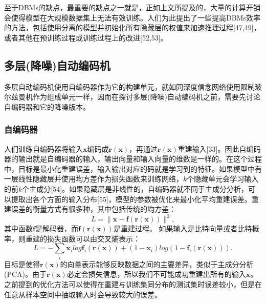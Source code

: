 \documentclass[a4paper]{article}
\begin{document}
至于DBMs的缺点，最重要的缺点之一就是，正如上文所提及的，大量的计算开销会使得模型在大规模数据集上无法有效训练。人们为此提出了一些提高DBMs效率的方法，包括使用分离的模型并初始化所有隐藏层的权值来加速推理过程[47,49]，或者其他在预训练过程或训练过程上的改进[52,53]。

\subsection{多层(降噪)自动编码机}
多层自动编码机使用自编码器作为它的构建单元，就如同深度信念网络使用限制玻尔兹曼机作为组成单元一样，因而在探讨多层(降噪)自动编码机之前，需要先讨论自编码器和它的降噪版本。

\subsubsection{自编码器}
人们训练自编码器将输入$\bm{x}$编码成$\bm{r}(\bm{x})$，再通过$\bm{r}(\bm{x})$重建输入[33]。因此自编码器的输出就是自编码器的输入，输出向量和输入向量的维数是一样的。在这个过程中，目标是最小化重建误差，输入输出对应的码就是学习到的特征。如果模型中有一层线性隐藏层并使用均方差作为损失函数来训练网络，$k$个隐藏单元会学习输入的前$k$个主成分[54]。如果隐藏层是非线性的，自编码器就不同于主成分分析，可以提取出各个方面的输入分布[55]，模型的参数被优化来最小化平均重建误差。重建误差的衡量方式有很多种，其中包括传统的均方差：
\begin{equation}
	L =
	\parallel \bm{x}-\bm{f}(\bm{r}(\bm{x})) \parallel ^{2},
\end{equation}
其中函数$\bm{f}$是解码器，而$\bm{f}(\bm{r}(\bm{x}))$是重建过程。
如果输入是比特向量或者比特概率，则重建的损失函数可以由交叉熵表示：
\begin{equation}
	L = -\sum_{i}\bm{x}_{i}log \bm{f}_{i}(\bm{r}(\bm{x}))+(1-\bm{x}_{i}) log (1-\bm{f}_{i}(\bm{r}(\bm{x}))).
\end{equation}
目标是使得$\bm{r}(\bm{x})$的向量表示能够反映数据之间的主要差异，类似于主成分分析(PCA)。由于$\bm{r}(\bm{x})$必定会损失信息，所以我们不可能成功重建出所有的输入$\bm{x}$。之前提到的优化方法可以使得在重建与训练集同分布的测试集时误差较小，但是在任意从样本空间中抽取输入时会导致较大的误差。
\end{document}
